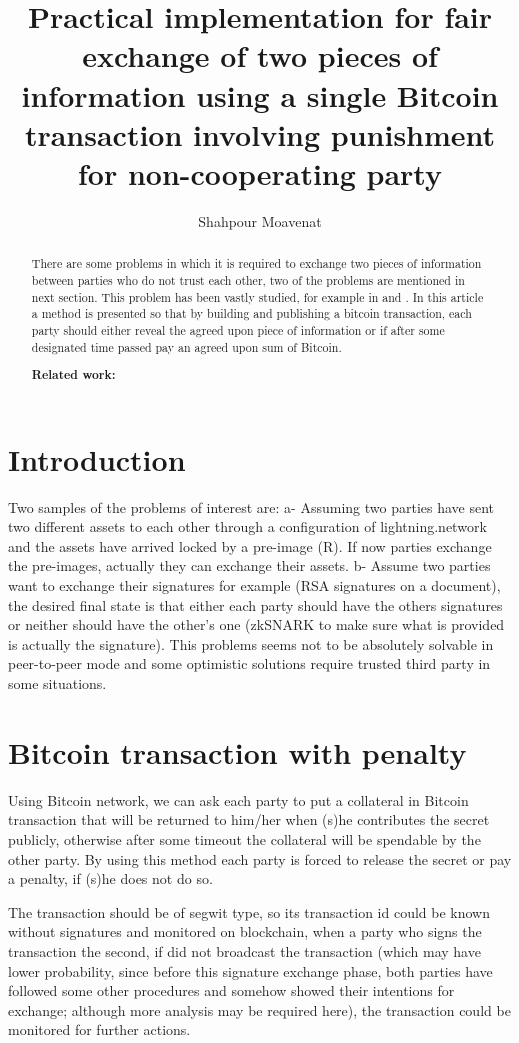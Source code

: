 \documentclass[]{article}
\title{Practical implementation for fair exchange of two pieces of information using a single Bitcoin transaction involving punishment for non-cooperating party}
\author{Shahpour Moavenat}
\begin{document}
\maketitle

\begin{abstract}
There are some problems in which it is required to exchange two pieces of information between parties who do not trust each other, two of the problems are mentioned in next section. This problem has been vastly studied, for example in \cite{ray2002} and \cite{asokan99}. In this article a method is presented so that by building and publishing a bitcoin transaction, each party should either reveal the agreed upon piece of information or if after some designated time passed pay an agreed upon sum of Bitcoin.

\textbf{Related work:} \cite{andrychowicz}
\end{abstract}

\section{Introduction}
Two samples of the problems of interest are: a- Assuming two parties have sent two different assets to each other through a configuration of lightning.network and the assets have arrived locked by a pre-image (R). If now parties exchange the pre-images, actually they can exchange their assets. b- Assume two parties want to exchange their signatures for example (RSA signatures on a document), the desired final state is that either each party should have the others signatures or neither should have the other's one (zkSNARK to make sure what is provided is actually the signature). This problems seems not to be absolutely solvable in peer-to-peer mode and some optimistic solutions require trusted third party in some situations.

\section{Bitcoin transaction with penalty}
Using Bitcoin network, we can ask each party to put a collateral in Bitcoin transaction that will be returned to him/her when (s)he contributes the secret publicly, otherwise after some timeout the collateral will be spendable by the other party. By using this method each party is forced to release the secret or pay a penalty, if (s)he does not do so.

The transaction should be of segwit type, so its transaction id could be known without signatures and monitored on blockchain, when a party who signs the transaction the second, if did not broadcast the transaction (which may have lower probability, since before this signature exchange phase, both parties have followed some other procedures and somehow showed their intentions for exchange; although more analysis may be required here), the transaction could be monitored for further actions.
\end{document}
